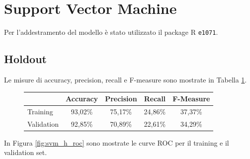 \section{Support Vector Machine}
Per l'addestramento del modello è stato utilizzato il package R 
\texttt{e1071}.

\subsection{Holdout}
Le misure di accuracy, precision, recall e F-measure sono mostrate in 
Tabella \ref{tab:svm_h_performance}.

\begin{figure}[H]
	\centering
	\begin{tabular}{lcccc}
		\toprule
		& \textbf{Accuracy} & \textbf{Precision} & \textbf{Recall} & 
		\textbf{F-Measure}  \\
		\midrule
		Training	& 93,02\% & 75,17\% & 24,86\% & 37,37\%    	\\ 
		Validation	& 92,85\% & 70,89\% & 22,61\% & 34,29\%   	\\ 
		\bottomrule
	\end{tabular}
	\label{tab:svm_h_performance}
\end{figure}

In Figura \ref{fig:svm_h_roc} sono mostrate le curve ROC per il training e il validation 
set.

